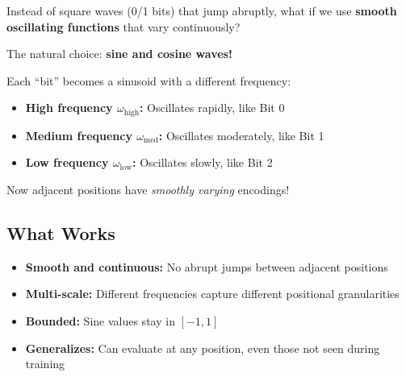 \documentclass{article}
\begin{document}
Instead of square waves (0/1 bits) that jump abruptly, what if we use \textbf{smooth oscillating functions} that vary continuously?

The natural choice: \textbf{sine and cosine waves!}

\begin{center}
\end{center}

Each ``bit'' becomes a sinusoid with a different frequency:
\begin{itemize}
\item \textbf{High frequency $\omega_{\text{high}}$:} Oscillates rapidly, like Bit 0
\item \textbf{Medium frequency $\omega_{\text{med}}$:} Oscillates moderately, like Bit 1
\item \textbf{Low frequency $\omega_{\text{low}}$:} Oscillates slowly, like Bit 2
\end{itemize}

Now adjacent positions have \emph{smoothly varying} encodings!

\subsection{What Works}

\begin{itemize}
\item \textbf{Smooth and continuous:} No abrupt jumps between adjacent positions
\item \textbf{Multi-scale:} Different frequencies capture different positional granularities
\item \textbf{Bounded:} Sine values stay in $[-1, 1]$
\item \textbf{Generalizes:} Can evaluate at any position, even those not seen during training
\end{itemize}
\end{document}
